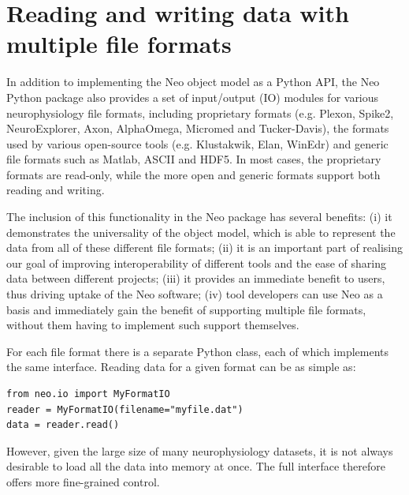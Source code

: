 \documentclass{frontiers}
\begin{document}
\section{Reading and writing data with multiple file formats}


In addition to implementing the Neo object model as a Python API, the Neo Python package also provides a set of input/output (IO) modules for various neurophysiology file formats, including proprietary formats (e.g. Plexon, Spike2, NeuroExplorer, Axon, AlphaOmega, Micromed and Tucker-Davis), the formats used by various open-source tools (e.g. Klustakwik, Elan, WinEdr) and generic file formats such as Matlab, ASCII and HDF5. 
In most cases, the proprietary formats are read-only, while the more open and generic formats support both reading and writing.

The inclusion of this functionality in the Neo package has several benefits:
(i) it demonstrates the universality of the object model, which is able to represent the data from all of these different file formats;
(ii) it is an important part of realising our goal of improving interoperability of different tools and the ease of sharing data between different projects;
(iii) it provides an immediate benefit to users, thus driving uptake of the Neo software;
(iv) tool developers can use Neo as a basis and immediately gain the benefit of supporting multiple file formats, without them having to implement such support themselves.


For each file format there is a separate Python class, each of which implements the same interface. Reading data for a given format can be as simple as:

\begin{lstlisting}[style=display]
from neo.io import MyFormatIO
reader = MyFormatIO(filename="myfile.dat")
data = reader.read()
\end{lstlisting}

However, given the large size of many neurophysiology datasets, it is not always desirable to load all the data into memory at once. The full interface therefore offers more fine-grained control.
\end{document}
